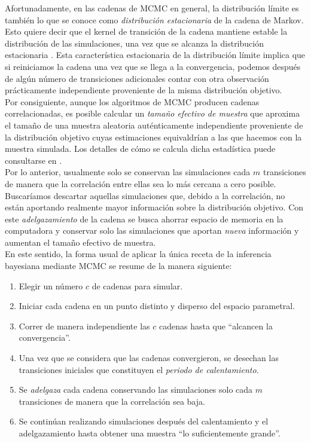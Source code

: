 Afortunadamente, en las cadenas de MCMC en general, la distribución límite es también lo que se conoce como \textit{distribución estacionaria} de la cadena de Markov. Esto quiere decir que el kernel de transición de la cadena mantiene estable la distribución de las simulaciones, una vez que se alcanza la distribución estacionaria \parencite{Neal93}. Esta característica estacionaria de la distribución límite implica que si reiniciamos la cadena una vez que se llega a la convergencia, podemos después de algún número de transiciones adicionales contar con otra observación prácticamente independiente proveniente de la misma distribución objetivo.\\ 

Por consiguiente, aunque los algoritmos de MCMC producen cadenas correlacionadas, es posible calcular un \textit{tamaño efectivo de muestra} que aproxima el tamaño de una muestra aleatoria auténticamente independiente proveniente de la distribución objetivo cuyas estimaciones equivaldrían a las que hacemos con la muestra simulada. Los detalles de cómo se calcula dicha estadística puede consultarse en \textcite{Gelman13}.\\ 

Por lo anterior, usualmente solo se conservan las simulaciones cada $m$ transiciones de manera que la correlación entre ellas sea lo más cercana a cero posible. Buscaríamos descartar aquellas simulaciones que, debido a la correlación, no están aportando realmente mayor información sobre la distribución objetivo. Con este \textit{adelgazamiento} de la cadena se busca ahorrar espacio de memoria en la computadora y conservar solo las simulaciones que aportan \textit{nueva} información y aumentan el tamaño efectivo de muestra.\\ 

En este sentido, la forma usual de aplicar la única receta de la inferencia bayesiana mediante MCMC se resume de la manera siguiente: 

\begin{enumerate}
\item Elegir un número $c$ de cadenas para simular.
\item Iniciar cada cadena en un punto distinto y disperso del espacio parametral. 
\item Correr de manera independiente las $c$ cadenas hasta que ``alcancen la convergencia''. 
\item Una vez que se considera que las cadenas convergieron, se desechan las transiciones iniciales que constituyen el \textit{periodo de calentamiento}. 
\item Se \textit{adelgaza} cada cadena conservando las simulaciones solo cada $m$ transiciones de manera que la correlación sea baja. 
\item Se continúan realizando simulaciones después del calentamiento y el adelgazamiento hasta obtener una muestra ``lo suficientemente grande''.  
\end{enumerate}

